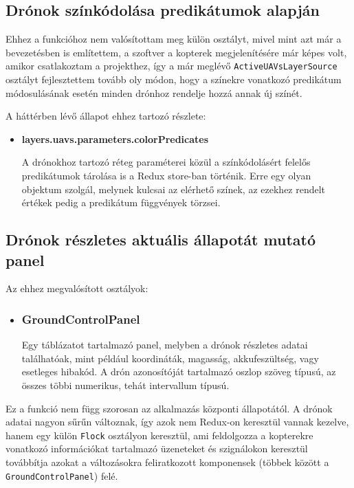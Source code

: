 \subsection{Drónok színkódolása predikátumok alapján}

Ehhez a funkcióhoz nem valósítottam meg külön osztályt, mivel mint azt már a
bevezetésben is említettem, a szoftver a kopterek megjelenítésére már képes
volt, amikor csatlakoztam a projekthez, így a már meglévő
\verb|ActiveUAVsLayerSource| osztályt fejlesztettem tovább oly módon, hogy
a színekre vonatkozó predikátum módosulásának esetén minden drónhoz rendelje
hozzá annak új színét.

\noindent A háttérben lévő állapot ehhez tartozó részlete:
\begin{itemize}
  \item \textbf{layers.uavs.parameters.colorPredicates}

  A drónokhoz tartozó réteg paraméterei közül a színkódolásért felelős
  predikátumok tárolása is a Redux store-ban történik. Erre egy olyan objektum
  szolgál, melynek kulcsai az elérhető színek, az ezekhez rendelt értékek
  pedig a predikátum függvények törzsei.
\end{itemize}

\subsection{Drónok részletes aktuális állapotát mutató panel}

\noindent Az ehhez megvalósított osztályok:
\begin{itemize}

\item\subsubsection{GroundControlPanel}
Egy táblázatot tartalmazó panel, melyben a drónok részletes adatai találhatóak,
mint például koordináták, magasság, akkufeszültség, vagy esetleges hibakód.
A drón azonosítóját tartalmazó oszlop szöveg típusú, az összes többi numerikus,
tehát intervallum típusú.

\end{itemize}

Ez a funkció nem függ szorosan az alkalmazás központi állapotától.
A drónok adatai nagyon sűrűn változnak, így azok nem Redux-on keresztül vannak
kezelve, hanem egy külön \verb|Flock| osztályon keresztül, ami feldolgozza a
kopterekre vonatkozó információkat tartalmazó üzeneteket és szignálokon
keresztül továbbítja azokat a változásokra feliratkozott komponensek (többek
között a \verb|GroundControlPanel|) felé.

